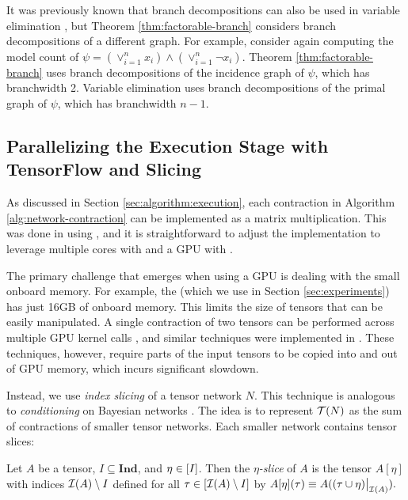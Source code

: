 It was previously known that branch decompositions can also be used in variable elimination \cite{BDP09}, but Theorem \ref{thm:factorable-branch} considers branch decompositions of a different graph. For example, consider again computing the model count of $\psi = \left(\lor_{i=1}^n x_i\right) \land \left(\lor_{i=1}^n \neg x_i\right)$. Theorem \ref{thm:factorable-branch} uses branch decompositions of the incidence graph of $\psi$, which has branchwidth 2. Variable elimination uses branch decompositions of the primal graph of $\psi$, which has branchwidth $n-1$. 

\subsection{Parallelizing the Execution Stage with TensorFlow and Slicing}
\label{sec:parallelizing:execution}
As discussed in Section \ref{sec:algorithm:execution}, each contraction in Algorithm \ref{alg:network-contraction} can be implemented as a matrix multiplication. This was done in \cite{DDV19} using  \cite{numpy}, and it is straightforward to adjust the implementation to leverage multiple cores with  and a GPU with  \cite{ABCCDDDGII16}.

The primary challenge that emerges when using a GPU is dealing with the small onboard memory. For example, the  (which we use in Section \ref{sec:experiments}) has just 16GB of onboard memory. This limits the size of tensors that can be easily manipulated. A single contraction of two tensors can be performed across multiple GPU kernel calls \cite{RRBSKH08}, and similar techniques were implemented in  \cite{FHZ19}. These techniques, however, require parts of the input tensors to be copied into and out of GPU memory, which incurs significant slowdown.

Instead, we use \emph{index slicing} \cite{CZHNS18,GK20,VBNHRBM19} of a tensor network $N$. This technique is analogous to \emph{conditioning} on Bayesian networks \cite{darwiche01,dechter99,pearl86,SAS94}. The idea is to represent $\mathcal{T}(N)$ as the sum of contractions of smaller tensor networks. Each smaller network contains tensor slices:

\begin{definition}
Let $A$ be a tensor, $I \subseteq \textbf{Ind}$, and $\eta \in [I]$. Then the \emph{$\eta$-slice} of $A$ is the tensor $A[\eta]$ with indices $\mathcal{I}(A) \setminus I$ defined for all $\tau \in [\mathcal{I}(A) \setminus I]$ by $A[\eta](\tau) \equiv A((\tau \cup \eta)\big|_{\mathcal{I}(A)}).$
\end{definition}


